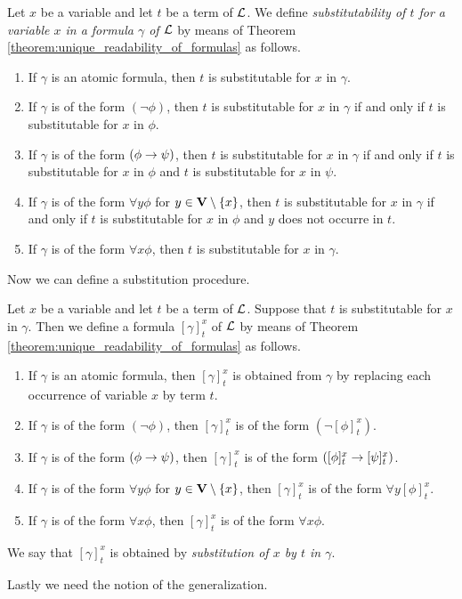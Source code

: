 \begin{definition}
Let $x$ be a variable and let $t$ be a term of ${\mathcal L}$. We define \textit{substitutability of $t$ for a variable $x$ in a formula $\gamma$ of ${\mathcal L}$} by means of Theorem \ref{theorem:unique_readability_of_formulas} as follows.
\begin{enumerate}[label=\textbf{(\arabic*)}, leftmargin=3.0em]
\item If $\gamma$ is an atomic formula, then $t$ is substitutable for $x$ in $\gamma$.
\item If $\gamma$ is of the form $(\neg \phi)$, then $t$ is substitutable for $x$ in $\gamma$ if and only if $t$ is substitutable for $x$ in $\phi$.
\item If $\gamma$ is of the form $(\phi \rightarrow  \psi)$, then $t$ is substitutable for $x$ in $\gamma$ if and only if $t$ is substitutable for $x$ in $\phi$ and $t$ is substitutable for $x$ in $\psi$.
\item If $\gamma$ is of the form $\forall y \phi$ for $y \in \mathbf{V}\setminus \{x\}$, then $t$ is substitutable for $x$ in $\gamma$ if and only if $t$ is substitutable for $x$ in $\phi$ and $y$ does not occurre in $t$.
\item If $\gamma$ is of the form $\forall x \phi$, then $t$ is substitutable for $x$ in $\gamma$.
\end{enumerate}
\end{definition}
\noindent
Now we can define a substitution procedure.

\begin{definition}
Let $x$ be a variable and let $t$ be a term of ${\mathcal L}$. Suppose that $t$ is substitutable for $x$ in $\gamma$. Then we define a formula $[\gamma]^x_t$ of ${\mathcal L}$ by means of Theorem \ref{theorem:unique_readability_of_formulas} as follows.
\begin{enumerate}[label=\textbf{(\arabic*)}, leftmargin=3.0em]
\item If $\gamma$ is an atomic formula, then $[\gamma]^x_t$ is obtained from $\gamma$ by replacing each occurrence of variable $x$ by term $t$.
\item If $\gamma$ is of the form $(\neg \phi)$, then $[\gamma]^x_t$ is of the form $(\neg [\phi]^x_t)$.
\item If $\gamma$ is of the form $(\phi \rightarrow \psi)$, then $[\gamma]^x_t$ is of the form $([\phi]^x_t \rightarrow [\psi]^x_t)$.
\item If $\gamma$ is of the form $\forall y \phi$ for $y \in \mathbf{V} \setminus \{x\}$, then $[\gamma]^x_t$ is of the form $\forall y [\phi]^x_t$.
\item If $\gamma$ is of the form $\forall x\phi$, then $[\gamma]^x_t$ is of the form $\forall x\phi$.
\end{enumerate}
We say that $[\gamma]^x_t$ is obtained by \textit{substitution of $x$ by $t$ in $\gamma$}.
\end{definition}
\noindent
Lastly we need the notion of the generalization.

